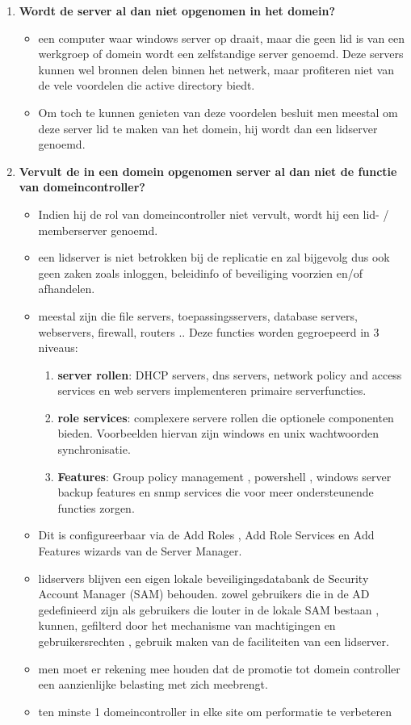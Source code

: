 \begin{enumerate}
\item \textbf{Wordt de server al dan niet opgenomen in het domein?}
\begin{itemize}
\item een computer waar windows server op draait, maar die geen lid is van een werkgroep of domein wordt een zelfstandige server genoemd. Deze servers kunnen wel bronnen delen binnen het netwerk, maar profiteren niet van de vele voordelen die active directory biedt.
\item Om toch te kunnen genieten van deze voordelen besluit men meestal om deze server lid te maken van het domein, hij wordt dan een lidserver genoemd.
\end{itemize}

\item \textbf{Vervult de in een domein opgenomen server al dan niet de functie van domeincontroller?} 
\begin{itemize}
\item Indien hij de rol van domeincontroller niet vervult, wordt hij een lid- / memberserver genoemd.
\item een lidserver is niet betrokken bij de replicatie en zal bijgevolg dus ook geen zaken zoals inloggen, beleidinfo of beveiliging voorzien en/of afhandelen.
\item meestal zijn die file servers, toepassingsservers, database servers, webservers, firewall, routers .. Deze functies worden gegroepeerd in 3 niveaus:
\begin{enumerate}
\item \textbf{server rollen}: DHCP servers, dns servers, network policy and access services en web servers implementeren primaire serverfuncties.
\item \textbf{role services}: complexere servere rollen die optionele componenten bieden. Voorbeelden hiervan zijn windows en unix wachtwoorden synchronisatie. 
\item \textbf{Features}: Group policy management , powershell , windows server backup features en snmp services die voor meer ondersteunende functies zorgen.
\end{enumerate}
\item Dit is configureerbaar via de Add Roles , Add Role Services en Add Features wizards van de Server Manager.
\item lidservers blijven een eigen lokale beveiligingsdatabank  de Security Account Manager (SAM) behouden. zowel gebruikers die in de AD gedefinieerd zijn als gebruikers die louter in de lokale SAM bestaan , kunnen, gefilterd door het mechanisme van machtigingen en gebruikersrechten , gebruik maken van de faciliteiten van een lidserver.
\item men moet er rekening mee houden dat de promotie tot domein controller een aanzienlijke belasting met zich meebrengt.
\item ten minste 1 domeincontroller in elke site om performatie te verbeteren
\end{itemize}


\end{enumerate}
